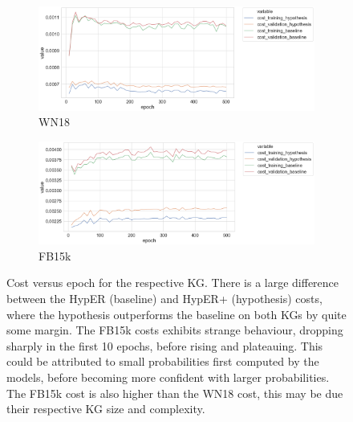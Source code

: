 \begin{figure}[H]
	\begin{subfigure}[b]{.5\linewidth}
   		\centering
    		\includegraphics[width=1.0\linewidth, height=0.6\linewidth]{WN18_Cost_Results}
		\captionsetup{justification=centering}
		\caption{WN18}
	\end{subfigure}
	\begin{subfigure}[b]{.5\linewidth}
   		\centering
		\includegraphics[width=1.0\linewidth, height=0.6\linewidth]{FB15k_Cost_Results}
		\captionsetup{justification=centering}
		\caption{FB15k}
	\end{subfigure}
	\captionsetup{justification=centering}
	\caption{Cost versus epoch for the respective KG. There is a large difference between the HypER (baseline) and HypER+ (hypothesis) costs, where the hypothesis outperforms the baseline on both KGs by quite some margin. The FB15k costs exhibits strange behaviour, dropping sharply in the first 10 epochs, before rising and plateauing. This could be attributed to small probabilities first computed by the models, before becoming more confident with larger probabilities. The FB15k cost is also higher than the WN18 cost, this may be due their respective KG size and complexity.}
\end{figure}

